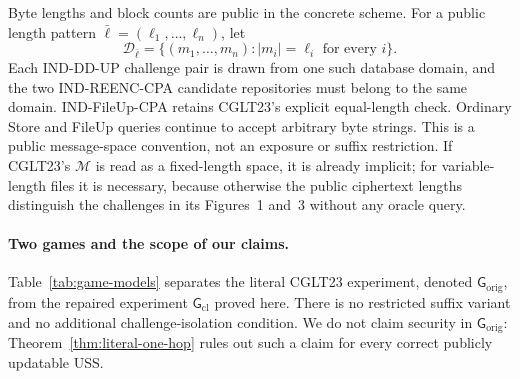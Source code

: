Byte lengths and block counts are public in the concrete scheme. For a public length pattern $\bar\ell=(\ell_1,\ldots,\ell_n)$, let
\[
 \mathcal D_{\bar\ell}=\{(m_1,\ldots,m_n):|m_i|=\ell_i\text{ for every }i\}.
\]
Each IND-DD-UP challenge pair is drawn from one such database domain, and the two IND-REENC-CPA candidate repositories must belong to the same domain. IND-FileUp-CPA retains CGLT23's explicit equal-length check. Ordinary Store and FileUp queries continue to accept arbitrary byte strings. This is a public message-space convention, not an exposure or suffix restriction. If CGLT23's $\mathcal M$ is read as a fixed-length space, it is already implicit; for variable-length files it is necessary, because otherwise the public ciphertext lengths distinguish the challenges in its Figures~1 and~3 without any oracle query.

\paragraph{Two games and the scope of our claims.}
Table~\ref{tab:game-models} separates the literal CGLT23 experiment, denoted $\mathsf G_{\mathrm{orig}}$, from the repaired experiment $\mathsf G_{\mathrm{cl}}$ proved here. There is no restricted suffix variant and no additional challenge-isolation condition. We do not claim security in $\mathsf G_{\mathrm{orig}}$: Theorem~\ref{thm:literal-one-hop} rules out such a claim for every correct publicly updatable USS.

